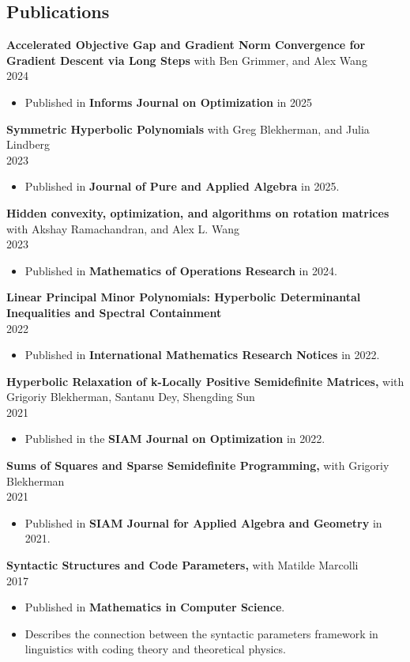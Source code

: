 \documentclass[margin]{res}
\begin{document}
\begin{resume}
\section{Publications}
{\bf  Accelerated Objective Gap and Gradient Norm Convergence for Gradient Descent via Long Steps} with Ben Grimmer, and Alex Wang \\ 2024
\begin{itemize} \itemsep -2pt %
\item Published in \textbf{Informs Journal on Optimization} in 2025
\end{itemize}
{\bf  Symmetric Hyperbolic Polynomials} with Greg Blekherman, and Julia Lindberg \\ 2023
\begin{itemize} \itemsep -2pt %
\item Published in \textbf{Journal of Pure and Applied Algebra} in 2025.
\end{itemize}
{\bf  Hidden convexity, optimization, and algorithms on rotation matrices  } with Akshay Ramachandran, and Alex L. Wang\\ 2023
\begin{itemize} \itemsep -2pt %
\item Published in \textbf{Mathematics of Operations Research} in 2024.
\end{itemize}
{\bf  Linear Principal Minor Polynomials: Hyperbolic Determinantal Inequalities and Spectral Containment } \\ 2022
\begin{itemize} \itemsep -2pt %
\item Published in \textbf{International Mathematics Research Notices} in 2022.
\end{itemize}
{\bf    Hyperbolic Relaxation of k-Locally Positive Semidefinite Matrices,} with Grigoriy Blekherman, Santanu Dey, Shengding Sun\\ 2021
\begin{itemize} \itemsep -2pt %
\item Published in the \textbf{SIAM Journal on Optimization} in 2022.
\end{itemize}
{\bf   Sums of Squares and Sparse Semidefinite Programming,} with Grigoriy Blekherman \\ 2021
\begin{itemize} \itemsep -2pt %
\item Published in \textbf{SIAM Journal for Applied Algebra and Geometry} in 2021.
\end{itemize}
{\bf  Syntactic Structures and Code Parameters,} with Matilde Marcolli \\ 2017
\begin{itemize} \itemsep -2pt %
\item Published in \textbf{Mathematics in Computer Science}.
\item Describes the connection between the syntactic parameters framework in linguistics with coding theory and theoretical physics.
\end{itemize}


\end{resume}
\end{document}
